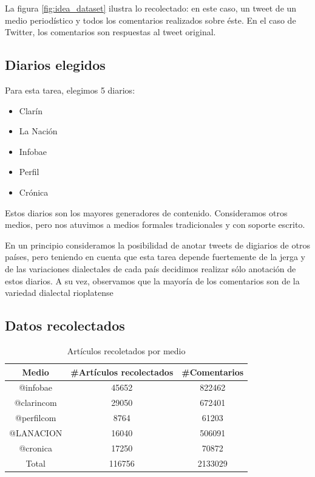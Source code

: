 La figura \ref{fig:idea_dataset} ilustra lo recolectado: en este caso, un tweet de un medio periodístico y todos los comentarios realizados sobre éste. En el caso de Twitter, los comentarios son respuestas al tweet original.


\subsection{Diarios elegidos}

Para esta tarea, elegimos 5 diarios:

\begin{itemize}
    \item Clarín
    \item La Nación
    \item Infobae
    \item Perfil
    \item Crónica
\end{itemize}

Estos diarios son los mayores generadores de contenido. Consideramos otros medios, pero nos atuvimos a medios formales tradicionales y con soporte escrito.

En un principio consideramos la posibilidad de anotar tweets de digiarios de otros países, pero teniendo en cuenta que esta tarea depende fuertemente de la jerga y de las variaciones dialectales de cada país decidimos realizar sólo anotación de estos diarios. A su vez, observamos que la mayoría de los comentarios son de la variedad dialectal rioplatense


\subsection{Datos recolectados}

\begin{table}[t]
    \centering
    \begin{tabular}{c|c|c}
    Medio      & \#Artículos recolectados & \#Comentarios \\
    \hline
    @infobae   &  45652   &  822462 \\
    @clarincom &  29050   &  672401 \\
    @perfilcom &  8764    &  61203  \\
    @LANACION  &  16040   &  506091 \\
    @cronica   &  17250   &  70872 \\
    \hline
    Total      & 116756  & 2133029 \\
    \end{tabular}
    \caption{Artículos recoletados por medio}
    \label{tab:articulos_recoletados_por_medio}
\end{table}


